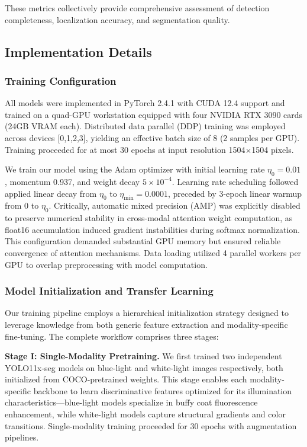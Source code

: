 These metrics collectively provide comprehensive assessment of detection completeness, localization accuracy, and segmentation quality.

\subsection{Implementation Details}

\subsubsection{Training Configuration} All models were implemented in PyTorch 2.4.1 with CUDA 12.4 support and trained on a quad-GPU workstation equipped with four NVIDIA RTX 3090 cards (24GB VRAM each). Distributed data parallel (DDP) training was employed across devices [0,1,2,3], yielding an effective batch size of 8 (2 samples per GPU). Training proceeded for at most 30 epochs at input resolution 1504$\times$1504 pixels.

We train our model using the Adam optimizer with initial learning rate $\eta_0 = 0.01$, momentum 0.937, and weight decay $5 \times 10^{-4}$. Learning rate scheduling followed applied linear decay from $\eta_0$ to $\eta_{\text{min}} = 0.0001$, preceded by 3-epoch linear warmup from 0 to $\eta_0$. Critically, automatic mixed precision (AMP) was explicitly disabled to preserve numerical stability in cross-modal attention weight computation, as float16 accumulation induced gradient instabilities during softmax normalization. This configuration demanded substantial GPU memory but ensured reliable convergence of attention mechanisms. Data loading utilized 4 parallel workers per GPU to overlap preprocessing with model computation.

\subsubsection{Model Initialization and Transfer Learning} Our training pipeline employs a hierarchical initialization strategy designed to leverage knowledge from both generic feature extraction and modality-specific fine-tuning. The complete workflow comprises three stages:

\textbf{Stage I: Single-Modality Pretraining.} We first trained two independent YOLO11x-seg models on blue-light and white-light images respectively, both initialized from COCO-pretrained weights. This stage enables each modality-specific backbone to learn discriminative features optimized for its illumination characteristics—blue-light models specialize in buffy coat fluorescence enhancement, while white-light models capture structural gradients and color transitions. Single-modality training proceeded for 30 epochs with augmentation pipelines.

